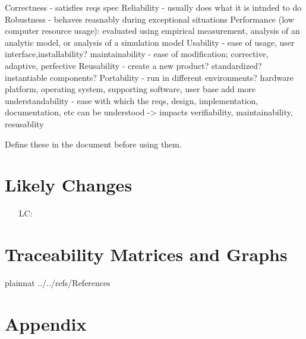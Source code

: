 \documentclass[12pt]{article}
\newcounter{lcnum} %
\begin{document}

Correctness - satisfies reqs spec
Reliability - usually does what it is intnded to do
Robustness - behaves reasnably during exceptional situations
Performance (low computer resource usage): evaluated using empirical measurement, analysis of an analytic model, or analysis of a simulation model
Usability - ease of usage, user interface,installability?
maintainability - ease of modification; corrective, adaptive, perfective
Reusability - create a new product? standardized? instantiable components?
Portability - run in different environments? hardware platform, operating system, supporting software, user base
add more
understandability - ease with which the reqs, design, implementation, documentation, etc can be understood -> impacts verifiability, maintainability, resusablity

Define these in the document before using them.



\section{Likely Changes}    

\noindent \begin{itemize}

\item[LC\refstepcounter{lcnum}\thelcnum\label{LC_meaningfulLabel}:] 

\end{itemize}

\section{Traceability Matrices and Graphs}




\newpage

 {plainnat}
 {../../refs/References}

\newpage

\section{Appendix}
\end{document}
